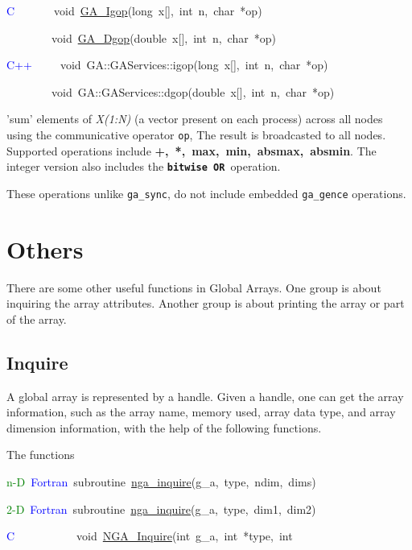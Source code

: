 \textcolor{blue}{C}~~~~~~~void~\href{https://hpc.pnl.gov/globalarrays/api/c_op_api.html\#ga_igop}{GA\_{}Igop}(long~x{[}{]},~int~n,~char~{*}op)~

~~~~~~~~void~\href{https://hpc.pnl.gov/globalarrays/api/c_op_api.html\#ga_dgop}{GA\_{}Dgop}(double~x{[}{]},~int~n,~char~{*}op)~

\textcolor{blue}{C++}~~~~~void~GA::GAServices::igop(long~x{[}{]},~int~n,~char~{*}op)~

~~~~~~~~void~GA::GAServices::dgop(double~x{[}{]},~int~n,~char~{*}op)

'sum' elements of \emph{X(1:N)} (a vector present on each process)
across all nodes using the communicative operator \texttt{op}, The
result is broadcasted to all nodes. Supported operations include
\textbf{+,~{*},~max,~min,~absmax,~absmin}.
The integer version also includes the \texttt{\textbf{bitwise OR }}operation.

These operations unlike \texttt{ga\_sync}, do not include embedded
\texttt{ga\_gence} operations. 


\section{Others }

There are some other useful functions in Global Arrays. One group
is about inquiring the array attributes. Another group is about printing
the array or part of the array. 


\subsection{Inquire }

A global array is represented by a handle. Given a handle, one can
get the array information, such as the array name, memory used, array
data type, and array dimension information, with the help of the following
functions.

The functions

\textcolor{green}{n-D}~\textcolor{blue}{Fortran}~subroutine~\href{https://hpc.pnl.gov/globalarrays/api/f_op_api.html\#ga_inquire}{nga\_{}inquire}(g\_a,~type,~ndim,~dims)~

\textcolor{green}{2-D}~\textcolor{blue}{Fortran}~subroutine~\href{https://hpc.pnl.gov/globalarrays/api/f_op_api.html\#ga_inquire}{nga\_{}inquire}(g\_a,~type,~dim1,~dim2)~

\textcolor{blue}{C}~~~~~~~~~~~void~\href{https://hpc.pnl.gov/globalarrays/api/c_op_api.html\#ga_inquire}{NGA\_{}Inquire}(int~g\_a,~int~{*}type,~int~

